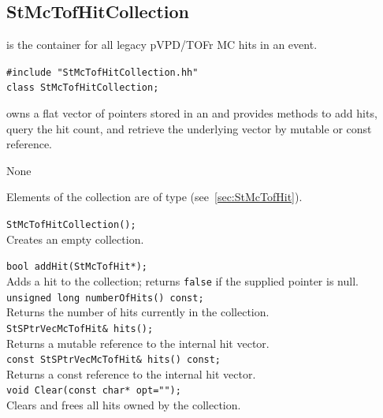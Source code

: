 \subsection{StMcTofHitCollection}
 
\label{sec:StMcTofHitCollection}
\begin{Entry}
\item[Summary]
     is the container for all legacy
    pVPD/TOFr MC hits in an event.

\item[Synopsis]
    \verb+#include "StMcTofHitCollection.hh"+\\
    \verb+class StMcTofHitCollection;+\\

\item[Description]
     owns a flat vector of
     pointers stored in an
     and provides methods to add hits,
    query the hit count, and retrieve the underlying vector by
    mutable or const reference.

\item[Persistence]
    None

\item[Related Classes]
    Elements of the collection are of type
     (see~\ref{sec:StMcTofHit}).

\item[Public\\ Constructors]
    \verb+StMcTofHitCollection();+\\
    Creates an empty collection.

\item[Public Member\\ Functions]
    \verb+bool addHit(StMcTofHit*);+\\
    Adds a hit to the collection; returns \texttt{false} if the
    supplied pointer is null.\\

    \verb+unsigned long numberOfHits() const;+\\
    Returns the number of hits currently in the collection.\\

    \verb+StSPtrVecMcTofHit& hits();+\\
    Returns a mutable reference to the internal hit vector.\\

    \verb+const StSPtrVecMcTofHit& hits() const;+\\
    Returns a const reference to the internal hit vector.\\

    \verb+void Clear(const char* opt="");+\\
    Clears and frees all hits owned by the collection.

\end{Entry}
\clearpage

